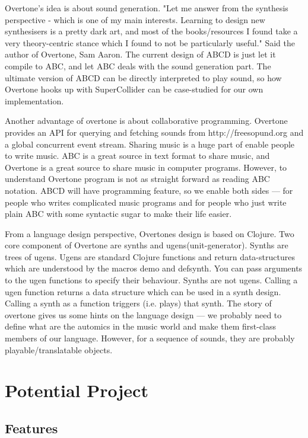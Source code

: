 Overtone's idea is about sound generation. "Let me answer from the synthesis perspective - which is one of my main interests. Learning to design new synthesisers is a pretty dark art, and most of the books/resources I found take a very theory-centric stance which I found to not be particularly useful." Said the author of Overtone, Sam Aaron\cite{Aaron13}. The current design of ABCD is just let it compile to ABC, and let ABC deals with the sound generation part. The ultimate version of ABCD can be directly interpreted to play sound, so how Overtone hooks up with SuperCollider can be case-studied for our own implementation.

Another advantage of overtone is about collaborative programming. Overtone provides an API for querying and fetching sounds from http://freesopund.org and a global concurrent event stream\cite{Aaron16}. Sharing music is a huge part of enable people to write music. ABC is a great source in text format to share music, and Overtone is a great source to share music in computer programs. However, to understand Overtone program is not as straight forward as reading ABC notation. ABCD will have programming feature, so we enable both sides --- for people who writes complicated music programs and for people who just write plain ABC with some syntactic sugar to make their life easier.

From a language design perspective, Overtones design is based on Clojure. Two core component of Overtone are synths and ugens(unit-generator). Synths are trees of ugens. Ugens are standard Clojure functions and return data-structures which are understood by the macros demo and defsynth. You can pass arguments to the ugen functions to specify their behaviour. Synths are not ugens. Calling a ugen function returns a data structure which can be used in a synth design. Calling a synth as a function triggers (i.e. plays) that synth.\cite{Aaron14} The story of overtone gives us some hints on the language design --- we probably need to define what are the automics in the music world and make them first-class members of our language. However, for a sequence of sounds, they are probably playable/translatable objects.


\section{Potential Project}

\subsection{Features}
